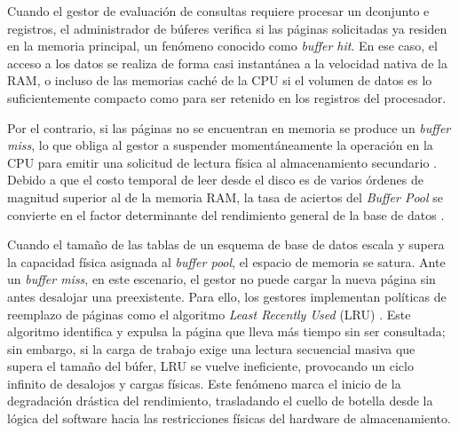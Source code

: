 \documentclass[12pt, letter paper]{report}
\begin{document}
        Cuando el gestor de evaluación de consultas requiere procesar un
        dconjunto e registros, el administrador de búferes verifica si las
        páginas solicitadas ya residen en la memoria principal, un fenómeno
        conocido como \textit{buffer hit}. En ese caso, el acceso a los datos se
        realiza de forma casi instantánea a la velocidad nativa de la RAM, o
        incluso de las memorias caché de la CPU si el volumen de datos es lo
        suficientemente compacto como para ser retenido en los registros del
        procesador.

        Por el contrario, si las páginas no se encuentran en memoria se produce
        un \textit{buffer miss}, lo que obliga al gestor a suspender
        momentáneamente la operación en la CPU para emitir una solicitud de
        lectura física al almacenamiento secundario \cite{tanenbaum2014modern}.
        Debido a que el costo temporal de leer desde el disco es de varios
        órdenes de magnitud superior al de la memoria RAM, la tasa de aciertos
        del \textit{Buffer Pool} se convierte en el factor determinante del
        rendimiento general de la base de datos \cite{ramakrishnan2003database}.

        Cuando el tamaño de las tablas de un esquema de base de datos escala y
        supera la capacidad física asignada al \textit{buffer pool}, el espacio
        de memoria se satura. Ante un \textit{buffer miss}, en este escenario,
        el gestor no puede cargar la nueva página sin antes desalojar una
        preexistente. Para ello, los gestores implementan políticas de reemplazo
        de páginas como el algoritmo \textit{Least Recently Used} (LRU)
        \cite{ramakrishnan2003database}. Este algoritmo identifica y expulsa la
        página que lleva más tiempo sin ser consultada; sin embargo, si la carga
        de trabajo exige una lectura secuencial masiva que supera el tamaño del
        búfer, LRU se vuelve ineficiente, provocando un ciclo infinito de
        desalojos y cargas físicas. Este fenómeno marca el inicio de la
        degradación drástica del rendimiento, trasladando el cuello de botella
        desde la lógica del software hacia las restricciones físicas del
        hardware de almacenamiento.
\end{document}
